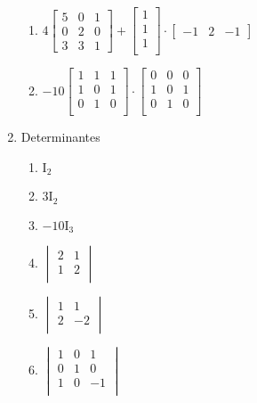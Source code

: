 \documentclass[a4paper]{article}
\begin{document}
\begin{multicols}{2}
\begin{enumerate}
\begin{enumerate}
  \item 
$4
\begin{bmatrix}
  5 & 0 & 1\\
  0 & 2 & 0\\
  3 & 3 & 1
\end{bmatrix}
+
\begin{bmatrix}
  1\\
  1\\
  1\\
\end{bmatrix}
\cdot
\begin{bmatrix}
  -1 & 2 & -1
\end{bmatrix}
$

  \item 
$-10
\begin{bmatrix}
  1 & 1 & 1\\
  1 & 0 & 1\\
  0 & 1 & 0\\
\end{bmatrix}
\cdot
\begin{bmatrix}
  0 & 0 & 0\\
  1 & 0 & 1\\
  0 & 1 & 0\\
\end{bmatrix}
$

\end{enumerate}

\item Determinantes

  \begin{enumerate}
  \item 
$
\mathrm{I}_2
$

  \item 
$
3 \mathrm{I}_2
$

\item 
$
-10 \mathrm{I}_3
$

\item 
$
\begin{vmatrix}
  2 & 1\\
  1 & 2\\
\end{vmatrix}
$

\item 
$
\begin{vmatrix}
  1 & 1\\
  2 & -2\\
\end{vmatrix}
$

\item 
$
\begin{vmatrix}
1 & 0 & 1\\
0 & 1 & 0\\
1 & 0 & -1\\
\end{vmatrix}
$


\end{enumerate}
\end{enumerate}
\end{multicols}
\end{document}
